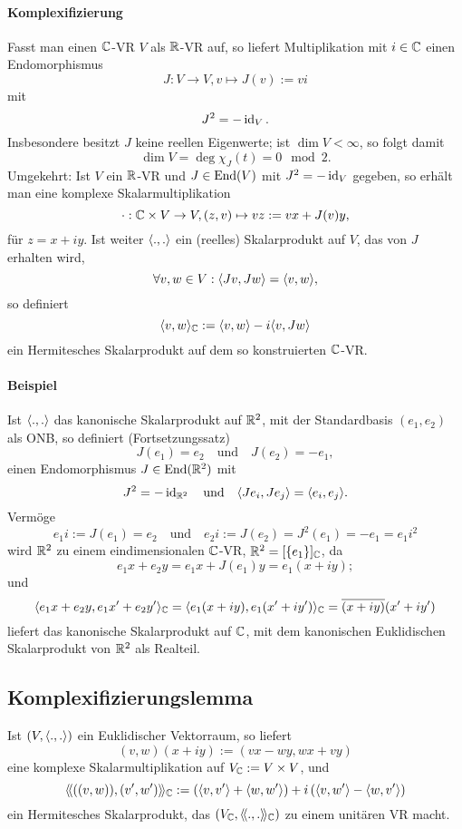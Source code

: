 \paragraph{Komplexifizierung}
	Fasst man einen $ \mathbb{C} $-VR $ V $ als $ \mathbb{R} $-VR auf, so liefert Multiplikation mit $ i\in \mathbb{C} $ einen Endomorphismus
		\[ J:V\to V, v\mapsto J(v):= vi \] %
	mit
		\[ J^2 = -\operatorname{id}_V. \]
	Insbesondere besitzt $ J $ keine reellen Eigenwerte;
	ist $ \dim V < \infty $, so folgt damit
		\[ \dim V = \deg{\chi_J}(t) = 0 \mod 2. \]
	Umgekehrt: Ist $ V $ ein $ \mathbb{R} $-VR und $ J\in \operatorname{End}(V) $ mit $ J^2 = -\operatorname{id}_V $ gegeben, so erhält man eine komplexe Skalarmultiplikation
		\[ \cdot :\mathbb{C}\times V \to V, (z,v)\mapsto vz := vx+J(v)y, \]
	für $ z = x+iy $.
	Ist weiter $ \langle .,. \rangle $ ein (reelles) Skalarprodukt auf $ V $, das von $ J $ erhalten wird, 
		\[ \forall v,w\in V: \langle Jv,Jw \rangle = \langle v,w \rangle, \]
	so definiert
		\[ \langle v,w \rangle_{\mathbb{C}} := \langle v,w \rangle -i \langle v,Jw \rangle \]
	ein Hermitesches Skalarprodukt auf dem so konstruierten $ \mathbb{C} $-VR.

\paragraph{Beispiel}\label{JDrehung}
	Ist $ \langle .,. \rangle $ das kanonische Skalarprodukt auf $ \mathbb{R}^2 $, mit der Standardbasis $ (e_1,e_2) $ als ONB, so definiert (Fortsetzungssatz)
		\[ J(e_1) = e_2 \quad\text{und}\quad J(e_2) = -e_1, \]
	einen Endomorphismus $ J\in\operatorname{End}(\mathbb{R}^2) $ mit
		\[ J^2 = -\operatorname{id}_{\mathbb{R}^2} \quad\text{und}\quad \langle Je_i,Je_j \rangle = \langle e_i,e_j \rangle. \]
	Vermöge
		\[ e_1i := J(e_1) = e_2 \quad\text{und}\quad e_2i := J(e_2) = J^2(e_1) = -e_1 = e_1 i^2 \]
	wird $ \mathbb{R}^2 $ zu einem eindimensionalen $ \mathbb{C} $-VR, $ \mathbb{R}^2 = [\{e_1\}]_{\mathbb{C}} $, da
		\[ e_1x+e_2y = e_1x+J(e_1)y = e_1 (x+iy); \]
	und
		\[ \langle e_1x+e_2y,e_1x'+e_2y' \rangle_{\mathbb{C}} = \langle e_1(x+iy),e_1(x'+iy') \rangle_{\mathbb{C}} = \overline{(x+iy)}(x'+iy') \]
	liefert das kanonische Skalarprodukt auf $ \mathbb{C} $, mit dem kanonischen Euklidischen Skalarprodukt von $ \mathbb{R}^2 $ als Realteil.

\subsection{Komplexifizierungslemma}
\begin{Lemma}[Komplexifizierungslemma]
	Ist $ (V,\langle .,. \rangle) $ ein Euklidischer Vektorraum, so liefert
		\[ (v,w)(x+iy) := (vx-wy,wx+vy) \]
	eine komplexe Skalarmultiplikation auf $ V_{\mathbb{C}} := V\times V $, und
		\[ \langle\! \langle ((v,w)),(v',w') \rangle\! \rangle_{\mathbb{C}} := \left(\langle v,v' \rangle+\langle w,w' \rangle \right)+i\left(\langle v,w' \rangle-\langle w,v' \rangle \right) \]
	ein Hermitesches Skalarprodukt, das $ (V_{\mathbb{C}},\langle\! \langle .,. \rangle\! \rangle_{\mathbb{C}}) $ zu einem unitären VR macht.
\end{Lemma}

